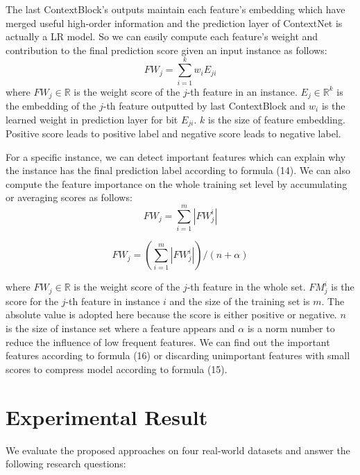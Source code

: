 \documentclass[sigconf]{acmart}
\begin{document}
The last ContextBlock's outputs maintain each feature’s embedding which have merged useful high-order information and the prediction layer of ContextNet is actually a LR model. So we can easily compute each feature's weight and contribution to the final prediction score given an input instance as follows:
\begin{equation}
  FW_j = \sum_{i=1}^{k}w_iE_{ji}
\end{equation}
where $FW_j \in \mathbb{R}$ is the weight score of the $j$-th feature in an instance. $E_j \in \mathbb{R}^k$ is the embedding of the $j$-th feature outputted by last ContextBlock and $w_i$ is the learned weight in prediction layer for bit $E_{ji}$. $k$ is the size of feature embedding. Positive score leads to positive label and negative score leads to negative label.


For a specific instance, we can detect important features which can explain why the instance has the final prediction label according to formula (14). We can also compute the feature importance on the whole training set level by accumulating or averaging scores as follows:
\begin{equation}
  FW_j = \sum_{i=1}^m|FW_j^{i}|
\end{equation}

\begin{equation}
  FW_j = (\sum^m_{i=1}|FW_j^i|)/(n+\alpha)
\end{equation}

where $FW_j \in\mathbb{R}$ is the weight score of the  $j$-th feature in the whole set. $FM_j^i$ is the score for the $j$-th feature in instance $i$ and the size of the training set is $m$. The absolute value is adopted here because the score is either positive or negative. $n$ is the size of instance set where a feature appears and $\alpha$ is a norm number to reduce the influence of low frequent features. We can find out the important features according to formula (16) or discarding unimportant features with small scores  to compress model according to formula (15).


\section{Experimental Result}
We evaluate the proposed approaches on four real-world datasets and answer the following research questions:
\end{document}
